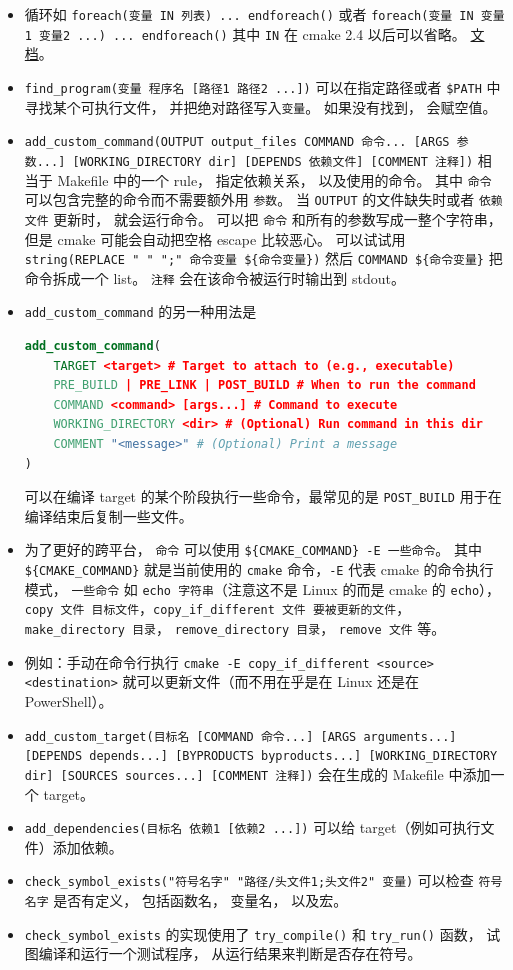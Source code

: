 \begin{itemize}
\item 循环如 \verb`foreach(变量 IN 列表) ... endforeach()` 或者 \verb`foreach(变量 IN 变量1 变量2 ...) ... endforeach()` 其中 \verb`IN` 在 cmake 2.4 以后可以省略。 \href{https://cmake.org/cmake/help/latest/command/foreach.html}{文档}。
\item \verb`find_program(变量 程序名 [路径1 路径2 ...])` 可以在指定路径或者 \verb`$PATH` 中寻找某个可执行文件， 并把绝对路径写入\verb`变量`。 如果没有找到， 会赋空值。
\item \verb`add_custom_command(OUTPUT output_files COMMAND 命令... [ARGS 参数...] [WORKING_DIRECTORY dir] [DEPENDS 依赖文件] [COMMENT 注释])` 相当于 Makefile 中的一个 rule， 指定依赖关系， 以及使用的命令。 其中 \verb`命令` 可以包含完整的命令而不需要额外用 \verb`参数`。 当 \verb`OUTPUT` 的文件缺失时或者 \verb`依赖文件` 更新时， 就会运行命令。 可以把 \verb`命令` 和所有的参数写成一整个字符串， 但是 cmake 可能会自动把空格 escape 比较恶心。 可以试试用 \verb`string(REPLACE " " ";" 命令变量 ${命令变量})` 然后 \verb`COMMAND ${命令变量}` 把命令拆成一个 list。 \verb`注释` 会在该命令被运行时输出到 stdout。
\item \verb`add_custom_command` 的另一种用法是
\begin{lstlisting}[language=cmake]
add_custom_command(
    TARGET <target> # Target to attach to (e.g., executable)
    PRE_BUILD | PRE_LINK | POST_BUILD # When to run the command
    COMMAND <command> [args...] # Command to execute
    WORKING_DIRECTORY <dir> # (Optional) Run command in this dir
    COMMENT "<message>" # (Optional) Print a message
)
\end{lstlisting}
可以在编译 target 的某个阶段执行一些命令，最常见的是 \verb`POST_BUILD` 用于在编译结束后复制一些文件。
\item 为了更好的跨平台， \verb`命令` 可以使用 \verb`${CMAKE_COMMAND} -E 一些命令`。 其中 \verb`${CMAKE_COMMAND}` 就是当前使用的 \verb`cmake` 命令，\verb`-E` 代表 cmake 的命令执行模式， \verb`一些命令` 如 \verb`echo 字符串`（注意这不是 Linux 的而是 cmake 的 \verb`echo`），\verb`copy 文件 目标文件`，\verb`copy_if_different 文件 要被更新的文件`， \verb`make_directory 目录`， \verb`remove_directory 目录`， \verb`remove 文件` 等。
\item 例如：手动在命令行执行 \verb`cmake -E copy_if_different <source> <destination>` 就可以更新文件（而不用在乎是在 Linux 还是在 PowerShell）。
\item \verb`add_custom_target(目标名 [COMMAND 命令...] [ARGS arguments...] [DEPENDS depends...] [BYPRODUCTS byproducts...] [WORKING_DIRECTORY dir] [SOURCES sources...] [COMMENT 注释])` 会在生成的 Makefile 中添加一个 target。
\item \verb`add_dependencies(目标名 依赖1 [依赖2 ...])` 可以给 target（例如可执行文件）添加依赖。
\item \verb`check_symbol_exists("符号名字" "路径/头文件1;头文件2" 变量)` 可以检查 \verb`符号名字` 是否有定义， 包括函数名， 变量名， 以及宏。
\item \verb`check_symbol_exists` 的实现使用了 \verb`try_compile()` 和 \verb`try_run()` 函数， 试图编译和运行一个测试程序， 从运行结果来判断是否存在符号。
\end{itemize}

